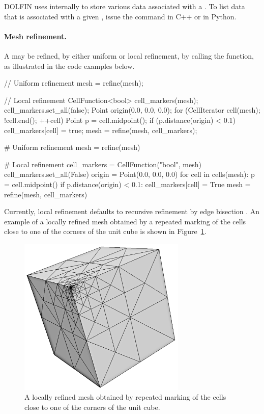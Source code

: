 DOLFIN uses  internally to store various data associated
with a . To list data that is associated with a given
, issue the command  in C++
or  in Python.


\paragraph{Mesh refinement.}

A  may be refined, by either uniform or local refinement, by
calling the  function, as illustrated in the code examples
below.
\begin{c++}
// Uniform refinement
mesh = refine(mesh);

// Local refinement
CellFunction<bool> cell_markers(mesh);
cell_markers.set_all(false);
Point origin(0.0, 0.0, 0.0);
for (CellIterator cell(mesh); !cell.end(); ++cell)
{
  Point p = cell.midpoint();
  if (p.distance(origin) < 0.1)
    cell_markers[cell] = true;
}
mesh = refine(mesh, cell_markers);
\end{c++}
\begin{python}
# Uniform refinement
mesh = refine(mesh)

# Local refinement
cell_markers = CellFunction("bool", mesh)
cell_markers.set_all(False)
origin = Point(0.0, 0.0, 0.0)
for cell in cells(mesh):
    p = cell.midpoint()
    if p.distance(origin) < 0.1:
        cell_markers[cell] = True
mesh = refine(mesh, cell_markers)
\end{python}
Currently, local refinement defaults to recursive refinement by edge
bisection \citep{Rivara1984,Rivara1992}. An example of a locally refined
mesh obtained by a repeated marking of the cells close to one of the
corners of the unit cube is shown in Figure~\ref{fig:logg-2:refinement}.

\begin{figure}
  \center\includegraphics[width=8cm]{chapters/logg-2/png/refined_cube.png}
  \caption{A locally refined mesh obtained by repeated marking of the
    cells close to one of the corners of the unit cube.}
  \label{fig:logg-2:refinement}
\end{figure}


